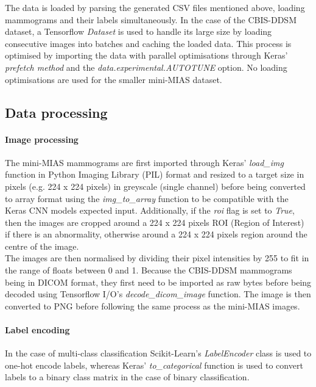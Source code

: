 The data is loaded by parsing the generated CSV files mentioned above, loading mammograms and their labels simultaneously. In the case of the CBIS-DDSM dataset, a Tensorflow \textit{Dataset} is used to handle its large size by loading consecutive images into batches and caching the loaded data. This process is optimised by importing the data with parallel optimisations through Keras' \textit{prefetch method} and the \textit{data.experimental.AUTOTUNE} option. No loading optimisations are used for the smaller mini-MIAS dataset.\\


\subsection{Data processing}

\paragraph{Image processing} 

The mini-MIAS mammograms are first imported through Keras' \textit{load\_img} function in Python Imaging Library (PIL) format and resized to a target size in pixels (e.g. 224 x 224 pixels) in greyscale (single channel) before being converted to array format using the \textit{img\_to\_array} function to be compatible with the Keras CNN models expected input. Additionally, if the \textit{roi} flag is set to \textit{True}, then the images are cropped around a 224 x 224 pixels ROI (Region of Interest) if there is an abnormality, otherwise around a 224 x 224 pixels region around the centre of the image.\\

The images are then normalised by dividing their pixel intensities by 255 to fit in the range of floats between 0 and 1. Because the CBIS-DDSM mammograms being in DICOM format, they first need to be imported as raw bytes before being decoded using Tensorflow I/O's \textit{decode\_dicom\_image} function. The image is then converted to PNG before following the same process as the mini-MIAS images.

\paragraph{Label encoding}

In the case of multi-class classification Scikit-Learn's \textit{LabelEncoder} class is used to one-hot encode labels, whereas Keras' \textit{to\_categorical} function is used to convert labels to a binary class matrix in the case of binary classification.

